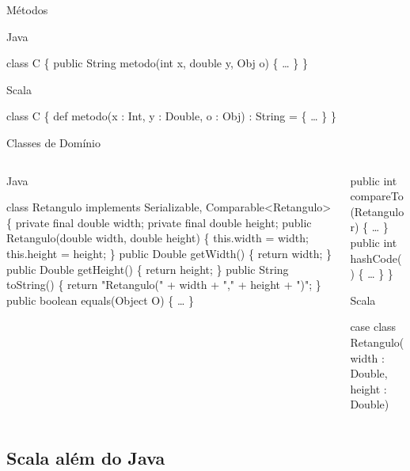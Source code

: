 \documentclass[12pt]{beamer}
\newenvironment{scala}{
\begin{block}{Scala} \begin{semiverbatim}
}{
\end{semiverbatim} \end{block}
}
\newenvironment{java}{
\protect\begin{block}{Java}
\protect\begin{semiverbatim}
}{
\protect\end{semiverbatim}
\protect\end{block}
}
\begin{document}
\begin{frame}[fragile]{Métodos}
\begin{java}
\small
class C \{
  public String metodo(int x, double y, Obj o) \{
    \dots
  \}
\}
\end{java}
\pause
\begin{scala}
\footnotesize
class C \{
  def metodo(x : Int, y : Double, o : Obj) : String = \{
    \dots
  \}
\}  
\end{scala}
\end{frame}

\begin{frame}[fragile]{Classes de Domínio}
\begin{columns}[t]
\begin{column}{5cm}

\tiny
\begin{java}
class Retangulo implements Serializable, 
   Comparable<Retangulo> \{
  private final double width;
  private final double height;
  public Retangulo(double width, 
                   double height) \{
    this.width = width;
    this.height = height;
  \}
  public Double getWidth() \{
    return width;
  \}
  public Double getHeight() \{
    return height;
  \}
  public String toString() \{
    return "Retangulo(" + width + 
    "," + height + ")";
  \}
  public boolean equals(Object O) \{
    \dots
  \}
\end{java}  
\end{column}

\begin{column}{5cm}
\tiny
\begin{block}{}

\begin{semiverbatim}
  public int compareTo(Retangulo r) \{ 
    \dots
  \}
  public int hashCode() \{
    \dots
  \}
\}
\end{semiverbatim}
\end{block}

\pause

\begin{scala}
case class Retangulo(
  width : Double, height : Double)
\end{scala}
\end{column}
\end{columns}
\end{frame}


\subsection{Scala além do Java} %
\end{document}
